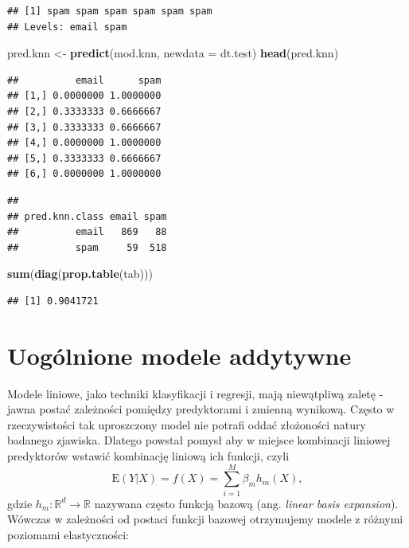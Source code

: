 \documentclass[
]{book}
\newenvironment{Shaded}{\begin{snugshade}}{\end{snugshade}}
\newcommand{\DataTypeTok}[1]{\textcolor[rgb]{0.13,0.29,0.53}{#1}}
\newcommand{\KeywordTok}[1]{\textcolor[rgb]{0.13,0.29,0.53}{\textbf{#1}}}
\newcommand{\NormalTok}[1]{#1}
\newcommand{\OperatorTok}[1]{\textcolor[rgb]{0.81,0.36,0.00}{\textbf{#1}}}
\newcommand{\StringTok}[1]{\textcolor[rgb]{0.31,0.60,0.02}{#1}}
\newcommand{\E}{\mathrm{E}}
\theoremstyle{plain}
\theoremstyle{definition}
\theoremstyle{definition}
\theoremstyle{definition}
\theoremstyle{definition}
\theoremstyle{remark}
\begin{document}
\begin{verbatim}
## [1] spam spam spam spam spam spam
## Levels: email spam
\end{verbatim}

\begin{Shaded}
\begin{Highlighting}[]
\NormalTok{pred.knn <-}\StringTok{ }\KeywordTok{predict}\NormalTok{(mod.knn, }\DataTypeTok{newdata =}\NormalTok{ dt.test)}
\KeywordTok{head}\NormalTok{(pred.knn)}
\end{Highlighting}
\end{Shaded}

\begin{verbatim}
##          email      spam
## [1,] 0.0000000 1.0000000
## [2,] 0.3333333 0.6666667
## [3,] 0.3333333 0.6666667
## [4,] 0.0000000 1.0000000
## [5,] 0.3333333 0.6666667
## [6,] 0.0000000 1.0000000
\end{verbatim}

\begin{Shaded}
\end{Shaded}

\begin{verbatim}
##               
## pred.knn.class email spam
##          email   869   88
##          spam     59  518
\end{verbatim}

\begin{Shaded}
\begin{Highlighting}[]
\KeywordTok{sum}\NormalTok{(}\KeywordTok{diag}\NormalTok{(}\KeywordTok{prop.table}\NormalTok{(tab)))}
\end{Highlighting}
\end{Shaded}

\begin{verbatim}
## [1] 0.9041721
\end{verbatim}

\hypertarget{uoguxf3lnione-modele-addytywne}{%
\chapter{Uogólnione modele addytywne}\label{uoguxf3lnione-modele-addytywne}}

Modele liniowe, jako techniki klasyfikacji i regresji, mają niewątpliwą zaletę - jawna postać zależności pomiędzy predyktorami i zmienną wynikową. Często w rzeczywistości tak uproszczony model nie potrafi oddać złożoności natury badanego zjawiska. Dlatego powstał pomysł aby w miejsce kombinacji liniowej predyktorów wstawić kombinację liniową ich funkcji, czyli
\begin{equation}
    \E(Y|X)=f(X) = \sum_{i=1}^M\beta_mh_m(X),
    \label{eq:row111}
\end{equation}
gdzie \(h_m:\mathbb{R}^d\to\mathbb{R}\) nazywana często funkcją bazową (ang. \emph{linear basis expansion}). Wówczas w zależności od postaci funkcji bazowej otrzymujemy modele z różnymi poziomami elastyczności:
\end{document}
